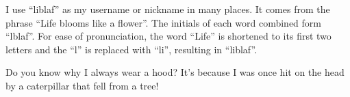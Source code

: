 

\vspace{4.0mm}

\begin{cvitems}
  \item I use ``liblaf'' as my username or nickname in many places.
        It comes from the phrase ``Life blooms like a flower''.
        The initials of each word combined form ``lblaf''.
        For ease of pronunciation, the word ``Life'' is shortened to its first two letters and the ``l'' is replaced with ``li'', resulting in ``liblaf''.
  \item Do you know why I always wear a hood?
        It's because I was once hit on the head by a caterpillar that fell from a tree!
\end{cvitems}
